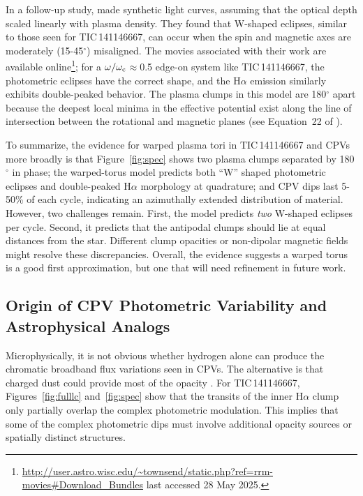 \documentclass[11pt,twocolumn,tighten]{aastex7}
\begin{document}
In a follow-up study, \citet{Townsend2008} made synthetic light
curves, assuming that the optical depth scaled linearly with plasma
density.  They found that W-shaped eclipses, similar to those seen for
TIC\,141146667, can occur when the spin and magnetic axes are
moderately (15-45$^\circ$) misaligned.  The movies associated with
their work are available
online\footnote{\url{http://user.astro.wisc.edu/\~townsend/static.php?ref=rrm-movies\#Download\_Bundles}
last accessed 28 May 2025.}; for a $\omega/\omega_{\rm
c}$$\approx$0.5 edge-on system like TIC\,141146667, the photometric
eclipses have the correct shape, and the H$\alpha$ emission similarly
exhibits double-peaked behavior.  The plasma clumps in this model are
180$^\circ$ apart because the deepest local minima in the effective
potential exist along the line of intersection between the rotational
and magnetic planes (see Equation~22 of \citealt{Townsend2005}).  

To summarize, the evidence for warped plasma tori in TIC\,141146667
and CPVs more broadly is that Figure~\ref{fig:spec} shows two plasma
clumps separated by 180$^\circ$ in phase; the warped-torus model
predicts both ``W'' shaped photometric eclipses and double-peaked
H$\alpha$ morphology at quadrature; and CPV dips last 5-50\% of each
cycle, indicating an azimuthally extended distribution of material.
However, two challenges remain. First, the model predicts {\it
two} W-shaped eclipses per cycle.  Second, it predicts that the
antipodal clumps should lie at equal distances from the star.
Different clump opacities or non-dipolar magnetic fields might resolve
these discrepancies.  Overall, the evidence suggests a warped torus is
a good first approximation, but one that will need refinement in
future work.

\subsection{Origin of CPV Photometric Variability and Astrophysical Analogs}

Microphysically, it is not obvious whether hydrogen alone can produce
the chromatic broadband flux variations seen in CPVs.  The alternative
is that charged dust could provide most of the opacity
\citep{Sanderson2023}.  For TIC\,141146667, Figures~\ref{fig:fulllc}
and~\ref{fig:spec} show that the transits of the inner H$\alpha$ clump
only partially overlap the complex photometric modulation.  This
implies that some of the complex photometric dips must involve
additional opacity sources or spatially distinct structures.
\end{document}
